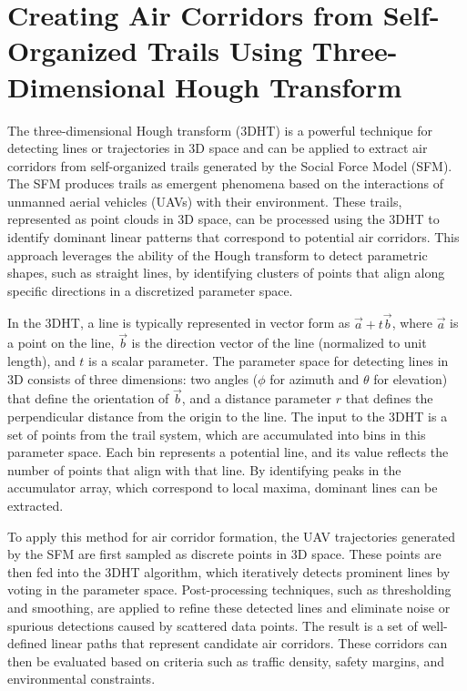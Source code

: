 \documentclass[letterpaper,11pt]{article}
\begin{document}


\section{Creating Air Corridors from Self-Organized Trails Using Three-Dimensional Hough Transform}

The three-dimensional Hough transform (3DHT) is a powerful technique for detecting lines or trajectories in 3D space and can be applied to extract air corridors from self-organized trails generated by the Social Force Model (SFM). The SFM produces trails as emergent phenomena based on the interactions of unmanned aerial vehicles (UAVs) with their environment. These trails, represented as point clouds in 3D space, can be processed using the 3DHT to identify dominant linear patterns that correspond to potential air corridors. This approach leverages the ability of the Hough transform to detect parametric shapes, such as straight lines, by identifying clusters of points that align along specific directions in a discretized parameter space.

In the 3DHT, a line is typically represented in vector form as \(\vec{a} + t\vec{b}\), where \(\vec{a}\) is a point on the line, \(\vec{b}\) is the direction vector of the line (normalized to unit length), and \(t\) is a scalar parameter. The parameter space for detecting lines in 3D consists of three dimensions: two angles (\(\phi\) for azimuth and \(\theta\) for elevation) that define the orientation of \(\vec{b}\), and a distance parameter \(r\) that defines the perpendicular distance from the origin to the line. The input to the 3DHT is a set of points from the trail system, which are accumulated into bins in this parameter space. Each bin represents a potential line, and its value reflects the number of points that align with that line. By identifying peaks in the accumulator array, which correspond to local maxima, dominant lines can be extracted.

To apply this method for air corridor formation, the UAV trajectories generated by the SFM are first sampled as discrete points in 3D space. These points are then fed into the 3DHT algorithm, which iteratively detects prominent lines by voting in the parameter space. Post-processing techniques, such as thresholding and smoothing, are applied to refine these detected lines and eliminate noise or spurious detections caused by scattered data points. The result is a set of well-defined linear paths that represent candidate air corridors. These corridors can then be evaluated based on criteria such as traffic density, safety margins, and environmental constraints.
\end{document}
